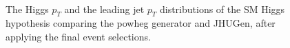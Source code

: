 \begin{figure}[!hbtp]
\centering
{}
\\
\caption{The Higgs $p_T$ and the leading jet $p_T$ distributions of the 
SM Higgs hypothesis comparing the powheg generator and JHUGen, after 
applying the final event selections. 
}
\label{fig:higgspt_0j}
\end{figure}



